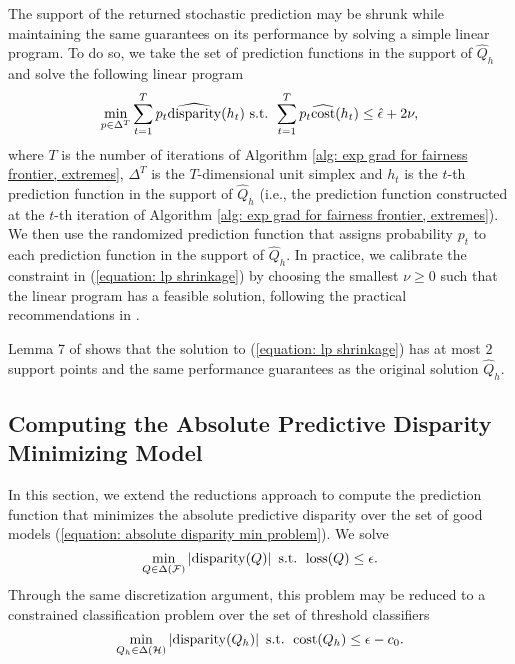 \documentclass{article}
\begin{document}
The support of the returned stochastic prediction may be shrunk while maintaining the same guarantees on its performance by solving a simple linear program. To do so, we take the set of prediction functions in the support of $\hat{Q}_h$ and solve the following linear program
    \begin{equation}\label{equation: lp shrinkage}
        \min_{p \in \Delta^T} \sum_{t=1}^{T} p_t \widehat{\operatorname{disparity}}(h_{t}) \mbox{ s.t. } \sum_{t=1}^{T} p_t \widehat{\operatorname{cost}}(h_t) \leq \hat{\epsilon} + 2\nu, 
    \end{equation}
where $T$ is the number of iterations of Algorithm \ref{alg: exp grad for fairness frontier, extremes}, $\Delta^{T}$ is the $T$-dimensional unit simplex and $h_t$ is the $t$-th prediction function in the support of $\hat{Q}_h$ (i.e., the prediction function constructed at the $t$-th iteration of Algorithm \ref{alg: exp grad for fairness frontier, extremes}). We then use the randomized prediction function that assigns probability $p_t$ to each prediction function in the support of $\hat{Q}_h$. In practice, we calibrate the constraint in (\ref{equation: lp shrinkage}) by choosing the smallest $\nu \geq 0$ such that the linear program has a feasible solution, following the practical recommendations in \cite{CotterEtAl(19)-ALT}. 

Lemma 7 of \cite{CotterEtAl(19)-ALT} shows that the solution to (\ref{equation: lp shrinkage}) has at most $2$ support points and the same performance guarantees as the original solution $\hat{Q}_h$.

\subsection{Computing the Absolute Predictive Disparity Minimizing Model}\label{section: computing abs disp min model}

In this section, we extend the reductions approach to compute the prediction function that minimizes the absolute predictive disparity over the set of good models (\ref{equation: absolute disparity min problem}). We solve
    \begin{equation}\label{equation: absolute disparity min problem, randomized predictor}
        \min_{Q \in \Delta(\mathcal{F})} \left| \operatorname{disparity}(Q) \right| \mbox{ s.t. } \operatorname{loss}(Q) \leq \epsilon.
    \end{equation}
Through the same discretization argument, this problem may be reduced to a constrained classification problem over the set of threshold classifiers
    \begin{equation}
        \min_{Q_h \in \Delta(\mathcal{H})} \left| \operatorname{disparity}(Q_h) \right| \mbox{ s.t. } \operatorname{cost}(Q_h) \leq \epsilon - c_0.
    \end{equation}
    
\end{document}

